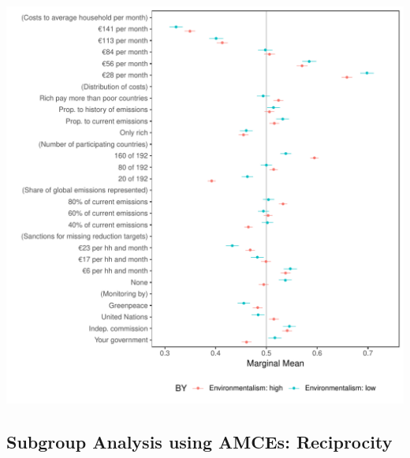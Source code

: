 \documentclass[a4paper,12pt]{article}\usepackage[]{graphicx}\usepackage[]{color}
\makeatletter
\def\maxwidth{ %
  \ifdim\Gin@nat@width>\linewidth
    \linewidth
  \else
    \Gin@nat@width
  \fi
}
\newenvironment{knitrout}{}{} %
\makeatother
\begin{document}
\begin{knitrout}
\color{fgcolor}
\includegraphics[width=\maxwidth]{figure/bechtel_subgroup_mm_environmentalism-1} 

\end{knitrout}

\clearpage

\subsection{Subgroup Analysis using AMCEs: Reciprocity}
\end{document}
